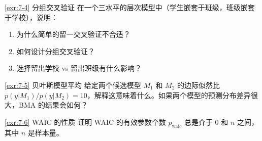 \begin{Exercise}{\ref{exr:7-4} 分组交叉验证}
  在一个三水平的层次模型中（学生嵌套于班级，班级嵌套于学校），说明：
  \begin{enumerate}
    \item 为什么简单的留一交叉验证不合适？
    \item 如何设计分组交叉验证？
    \item 选择留出学校 vs 留出班级有什么影响？
  \end{enumerate}
\end{Exercise}

\begin{Exercise}{\ref{exr:7-5} 贝叶斯模型平均}
  给定两个候选模型 $M_1$ 和 $M_2$ 的边际似然比 $p(y|M_1)/p(y|M_2) = 10$，解释这意味着什么。如果两个模型的预测分布差异很大，BMA 的结果会如何？
\end{Exercise}

\begin{Exercise}{\ref{exr:7-6} WAIC 的性质}
  证明 WAIC 的有效参数个数 $p_{\text{waic}}$ 总是介于 0 和 $n$ 之间，其中 $n$ 是样本量。
\end{Exercise}

\endinput
